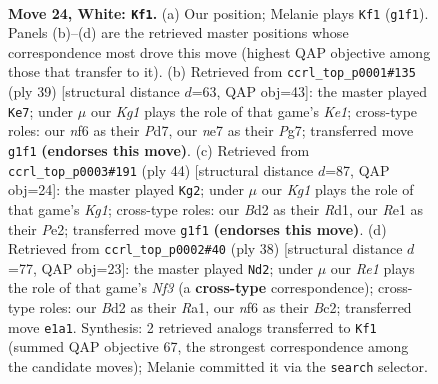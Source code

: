\documentclass[11pt]{article}
\begin{document}
\clearpage

\begin{figure}[p]\centering
\begin{subfigure}{0.46\textwidth}\centering
\resizebox{\linewidth}{!}{%
\newchessgame
\chessboard[
  setfen={1rb2r1k/p3np2/1p2pnpp/2P5/1RP5/N3PB1P/P2B1PP1/4R1K1 w - - 6 24},
  showmover=false,
  pgfstyle=straightmove, color=movearrow, markmove={g1-f1}
]}
\caption{}
\end{subfigure}\hfill
\begin{subfigure}{0.46\textwidth}\centering
\resizebox{\linewidth}{!}{%
\newchessgame
\chessboard[
  setfen={2b1k2r/3p1ppp/rp2p3/2b1P3/1pN1P3/6P1/PP3P1P/R1BR2K1 b k - 3 20},
  showmover=false,
  pgfstyle=straightmove, color=movearrow, markmove={e8-e7}
]}
\caption{}
\end{subfigure}
\\[4pt]
\begin{subfigure}{0.46\textwidth}\centering
\resizebox{\linewidth}{!}{%
\newchessgame
\chessboard[
  setfen={r2r2k1/1p3pp1/p1pnpn1p/8/1P1P2PP/2B2B2/1P2PP2/R2R2K1 w - - 0 23},
  showmover=false,
  pgfstyle=straightmove, color=movearrow, markmove={g1-g2}
]}
\caption{}
\end{subfigure}\hfill
\begin{subfigure}{0.46\textwidth}\centering
\resizebox{\linewidth}{!}{%
\newchessgame
\chessboard[
  setfen={1rb1r1k1/p3npp1/1p5p/3p4/P1pP4/2P1PN2/2B2PPP/RR4K1 w - - 0 20},
  showmover=false,
  pgfstyle=straightmove, color=movearrow, markmove={f3-d2}
]}
\caption{}
\end{subfigure}
\caption{\textbf{Move 24, White: \texttt{Kf1}.} (a) Our position; Melanie plays \texttt{Kf1} (\texttt{g1f1}). Panels (b)--(d) are the retrieved master positions whose correspondence most drove this move (highest QAP objective among those that transfer to it). (b) Retrieved from \texttt{ccrl\_top\_p0001\#135} (ply 39) [structural distance $d$=63, QAP obj=43]: the master played \texttt{Ke7}; under $\mu$ our \emph{Kg1} plays the role of that game's \emph{Ke1}; cross-type roles: our \emph{n}f6 as their \emph{P}d7, our \emph{n}e7 as their \emph{P}g7; transferred move \texttt{g1f1} \textbf{(endorses this move)}. (c) Retrieved from \texttt{ccrl\_top\_p0003\#191} (ply 44) [structural distance $d$=87, QAP obj=24]: the master played \texttt{Kg2}; under $\mu$ our \emph{Kg1} plays the role of that game's \emph{Kg1}; cross-type roles: our \emph{B}d2 as their \emph{R}d1, our \emph{R}e1 as their \emph{P}e2; transferred move \texttt{g1f1} \textbf{(endorses this move)}. (d) Retrieved from \texttt{ccrl\_top\_p0002\#40} (ply 38) [structural distance $d$=77, QAP obj=23]: the master played \texttt{Nd2}; under $\mu$ our \emph{Re1} plays the role of that game's \emph{Nf3} (a \textbf{cross-type} correspondence); cross-type roles: our \emph{B}d2 as their \emph{R}a1, our \emph{n}f6 as their \emph{B}c2; transferred move \texttt{e1a1}. Synthesis: 2 retrieved analogs transferred to \texttt{Kf1} (summed QAP objective 67, the strongest correspondence among the candidate moves); Melanie committed it via the \texttt{search} selector.}
\label{fig:thought-m46}
\end{figure}
\end{document}
